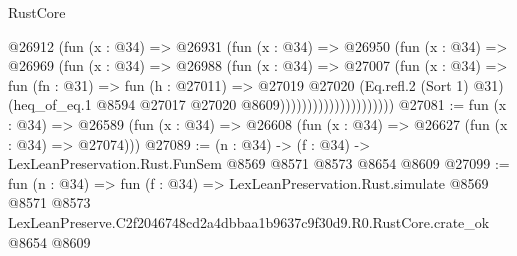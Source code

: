 \begin{lexlean}{RustCore}
\begin{coremodule}
                              @26912
                                (fun (x : @34) =>
                                @26931
                                  (fun (x : @34) =>
                                  @26950
                                    (fun (x : @34) =>
                                    @26969
                                      (fun (x : @34) =>
                                      @26988
                                        (fun (x : @34) =>
                                        @27007
                                          (fun (x : @34) =>
                                          fun (fn : @31) =>
                                          fun (h : @27011) =>
                                          @27019
                                            @27020
                                            (Eq.refl.{2} (Sort 1) @31)
                                            (heq_of_eq.{1}
                                              @8594
                                              @27017
                                              @27020
                                              @8609)))))))))))))))))))))
@27081 := fun (x : @34) =>
  @26589 (fun (x : @34) => @26608 (fun (x : @34) => @26627 (fun (x : @34) => @27074)))
@27089 := (n : @34) -> (f : @34) -> LexLeanPreservation.Rust.FunSem @8569 @8571 @8573 @8654 @8609
@27099 := fun (n : @34) =>
  fun (f : @34) =>
  LexLeanPreservation.Rust.simulate
    @8569
    @8571
    @8573
    LexLeanPreserve.C2f2046748cd2a4dbbaa1b9637c9f30d9.R0.RustCore.crate_ok
    @8654
    @8609
\end{coremodule}
\end{lexlean}
